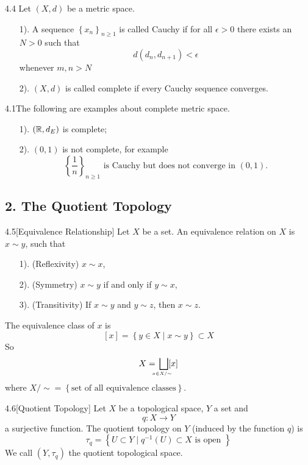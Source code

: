 \begin{customdefinition}{4.4}
Let $(X, d)$ be a metric space.
\begin{enumerate}
    \item[1).] A sequence $\left\{x_n\right\}_{n \geqslant 1}$ is called Cauchy if for all $\epsilon > 0$ there exists an $N > 0$ such that 
                $$d(d_n, d_{n+1}) < \epsilon$$
                whenever $m, n > N$
    \item[2).] $(X, d)$ is called complete if every Cauchy sequence converges.
\end{enumerate}
\end{customdefinition}

\begin{customexa}{4.1}The following are examples about complete metric space.
\begin{enumerate}
    \item[1).]$\left(\mathbb{R}, d_E\right)$ is complete;
    \item[2).]$(0,1)$ is not complete, for example
    $$\left\{\dfrac{1}{n}\right\}_{n \geqslant 1}\text{ is Cauchy but does not converge in }(0,1).$$
\end{enumerate}
\end{customexa}

\subsection*{2. The Quotient Topology}

\begin{customdefinition}{4.5}[Equivalence Relationship]
Let $X$ be a set. An equivalence relation on $X$ is $x \sim y$, such that
\begin{enumerate}
    \item[1).] (Reflexivity) $x \sim x$, 
    \item[2).] (Symmetry) $x \sim y$ if and only if $y \sim x$,
    \item[3).] (Transitivity) If $x \sim y$ and $y \sim z$, then $x \sim z$.
\end{enumerate}
The equivalence class of $x$ is 
$$[x] = \left\{y \in X \mid x \sim y\right\} \subset X$$
So 
$$X = \underaccent{x \in X/\sim}{\bigsqcup}[x]$$ 
where $X/\sim = \left\{\text{set of all equivalence classes}\right\}$.
\end{customdefinition}

\begin{customdefinition}{4.6}[Quotient Topology]
Let $X$ be a topological space, $Y$ a set and 
$$q: X\longrightarrow Y$$
a surjective function. The quotient topology on $Y$ (induced by the function $q$) is 
$$\tau_q = \left\{U \subset Y \mid q^{-1}(U) \subset X \text{ is open }\right\}$$
We call $(Y, \tau_q)$ the quotient topological space.\\
\end{customdefinition}

